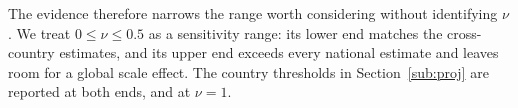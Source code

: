 \documentclass[11pt]{article}
\begin{document}
The evidence therefore narrows the range worth considering without identifying $\nu$. We treat
$0\le\nu\le0.5$ as a sensitivity range: its lower end matches the cross-country estimates, and its upper end
exceeds every national estimate and leaves room for a global scale effect. The country thresholds in
Section~\ref{sub:proj} are reported at both ends, and at $\nu=1$.


\singlespacing


\end{document}
